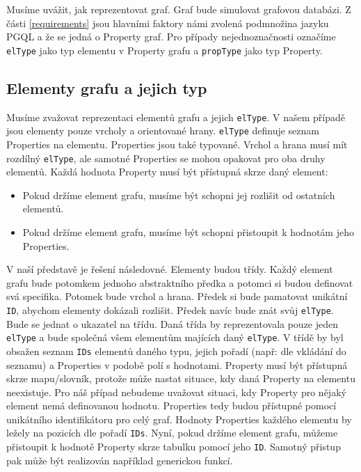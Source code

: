 Musíme uvážit, jak reprezentovat graf.
Graf bude simulovat grafovou databázi.
Z části \ref{requirements} jsou hlavními faktory námi zvolená podmnožina jazyku PGQL a že se jedná o Property graf.
Pro případy nejednoznačnosti označíme \verb+elType+ jako typ elementu v Property grafu a \verb+propType+ jako typ Property.

\subsection{Elementy grafu a jejich typ}

Musíme zvažovat reprezentaci elementů grafu a jejich \verb+elType+.
V našem případě jsou elementy pouze vrcholy a orientované hrany.
\verb+elType+ definuje seznam Properties na elementu. 
Properties jsou také typované.
Vrchol a hrana musí mít rozdílný \verb+elType+, ale samotné Properties se mohou opakovat pro oba druhy elementů.
Každá hodnota Property musí být přístupná skrze daný element:

\begin{itemize}

\item Pokud držíme element grafu, musíme být schopni jej rozlišit od ostatních elementů.

\item Pokud držíme element grafu, musíme být schopni přistoupit k hodnotám jeho Properties.

\end{itemize}

V naší představě je řešení následovné.
Elementy budou třídy.
Každý element grafu bude potomkem jednoho abstraktního předka a potomci si budou definovat svá specifika.
Potomek bude vrchol a hrana.
Předek si bude pamatovat unikátní \verb+ID+, abychom elementy dokázali rozlišit. 
Předek navíc bude znát svůj \verb+elType+. 
Bude se jednat o ukazatel na třídu.
Daná třída by reprezentovala pouze jeden \verb+elType+ a bude společná všem elementům majících daný \verb+elType+.
V třídě by byl obsažen seznam \verb+IDs+ elementů daného typu, jejich pořadí (např: dle vkládání do seznamu) a Properties v podobě polí s hodnotami.
Property musí být přístupná skrze mapu/slovník, protože může nastat situace, kdy daná Property na elementu neexistuje. 
Pro náš případ nebudeme uvažovat situaci, kdy Property pro nějaký element nemá definovanou hodnotu.
Properties tedy budou přístupné pomocí unikátního identifikátoru pro celý graf.
Hodnoty Properties každého elementu by ležely na pozicích dle pořadí \verb+IDs+.
Nyní, pokud držíme element grafu, můžeme přistoupit k hodnotě Property skrze tabulku pomocí jeho \verb+ID+.    
Samotný přistup pak může být realizován například generickou funkcí. 

